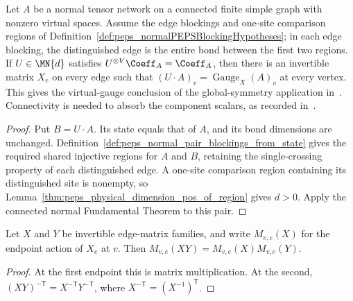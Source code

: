 \begin{lemma}%
    \label{thm:peps_normal_onsite_symmetry_gauge}
    \leanok

    Let $A$ be a normal tensor network on a connected finite simple graph
    with nonzero virtual spaces. Assume the edge blockings and one-site
    comparison regions of
    Definition~\ref{def:peps_normalPEPSBlockingHypotheses}; in each edge
    blocking, the distinguished edge is the entire bond between the first
    two regions. If $U\in\MN{d}$ satisfies
    $U^{\otimes V}\Coeff_A=\Coeff_A$, then there is an invertible matrix
    $X_e$ on every edge such that $(U\cdot A)_v=\operatorname{Gauge}_X(A)_v$
    at every vertex.
    This gives the virtual-gauge conclusion of the global-symmetry
    application in~\cite[lines~1696--1713]{Molnar2018NormalPEPS}.
    Connectivity is needed to absorb the component scalars, as recorded
    in~\cite{gap:peps_gaugeConsistency_connectivity_gap}.
\end{lemma}
\begin{proof}\leanok
    Put $B=U\cdot A$. Its state equals that of $A$, and its bond
    dimensions are unchanged. Definition~\ref{def:peps_normal_pair_blockings_from_state}
    gives the required shared injective regions for $A$ and $B$, retaining
    the single-crossing property of each distinguished edge.
    A one-site comparison region containing its distinguished site is
    nonempty, so Lemma~\ref{thm:peps_physical_dimension_pos_of_region}
    gives $d>0$. Apply the connected normal Fundamental Theorem to this pair.
\end{proof}

\begin{lemma}%
    \label{thm:peps_endpoint_gauge_mul}
    \leanok

    Let $X$ and $Y$ be invertible edge-matrix families, and write
    $M_{v,e}(X)$ for the endpoint action of $X_e$ at $v$. Then
    $M_{v,e}(XY)=M_{v,e}(X)M_{v,e}(Y)$.
\end{lemma}
\begin{proof}\leanok
    At the first endpoint this is matrix multiplication. At the second,
    $(XY)^{-\mathsf T}=X^{-\mathsf T}Y^{-\mathsf T}$, where
    $X^{-\mathsf T}=(X^{-1})^{\mathsf T}$.
\end{proof}

